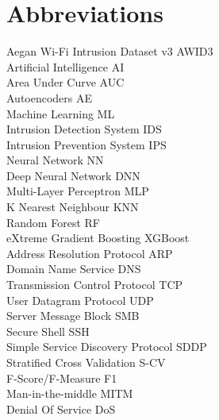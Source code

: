 
\section*{Abbreviations}
\large 

Aegan Wi-Fi Intrusion Dataset v3 \hfill AWID3 \\
Artificial Intelligence \hfill AI \\
Area Under Curve \hfill AUC \\
Autoencoders \hfill AE \\
Machine Learning \hfill ML \\
Intrusion Detection System \hfill IDS \\
Intrusion Prevention System \hfill IPS \\
Neural Network \hfill NN \\
Deep Neural Network \hfill DNN \\
Multi-Layer Perceptron \hfill MLP \\
K Nearest Neighbour \hfill KNN \\
Random Forest \hfill RF \\
eXtreme Gradient Boosting \hfill XGBoost \\
Address Resolution Protocol \hfill ARP \\
Domain Name Service \hfill DNS \\
Transmission Control Protocol \hfill TCP \\
User Datagram Protocol \hfill UDP \\
Server Message Block \hfill SMB \\
Secure Shell \hfill SSH \\
Simple Service Discovery Protocol \hfill SDDP \\
Stratified Cross Validation \hfill S-CV \\
F-Score/F-Measure \hfill F1 \\
Man-in-the-middle \hfill MITM \\
Denial Of Service \hfill DoS \\
\\

